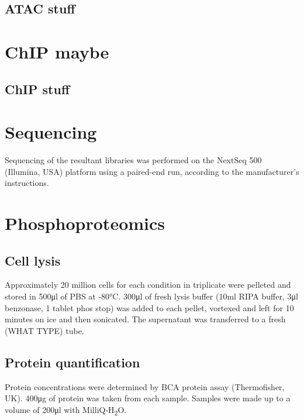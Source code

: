 \subsection{ATAC stuff}

\section{ChIP maybe}
\subsection{ChIP stuff}

\section{Sequencing}
Sequencing of the resultant libraries was performed on the NextSeq 500 (Illumina, USA) platform using a paired-end run, according to the manufacturer's instructions.

%
\section{Phosphoproteomics}
%
\subsection{Cell lysis}
Approximately 20 million cells for each condition in triplicate were pelleted and stored in 500\si{\ul} of PBS at -80\si{\degreeCelsius}. 300\si{\ul} of fresh lysis buffer (10\si{\ml} RIPA buffer, 3\si{\ul} benzonase, 1 tablet phos stop) was added to each pellet, vortexed and left for 10 minutes on ice and then sonicated.
The supernatant was transferred to a fresh (WHAT TYPE) tube.

\subsection{Protein quantification}
Protein concentrations were determined by BCA protein assay (Thermofisher, UK). 400\si{\ug} of protein was taken from each sample. Samples were made up to a volume of 200\si{\ul} with MilliQ-H\textsubscript{2}O.

